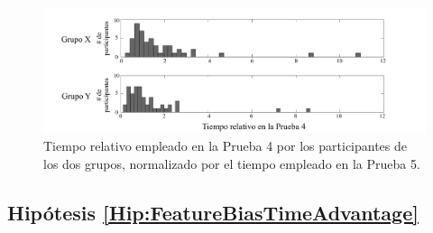  
\begin{figure}
\begin{center}
	\includegraphics[scale=.5]{../figuras/brm/results_2_sp.pdf}
\end{center}
\caption{
Tiempo relativo empleado en la Prueba 4 por los participantes de los dos grupos, normalizado por el tiempo empleado en la Prueba 5.
}
\label{fig:results2}
\end{figure}



\subsection{Hipótesis \ref{Hip:FeatureBiasTimeAdvantage}}\label{Results:FeatureBiasTimeAdvantage} 

